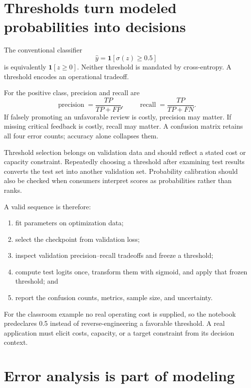 \section{Thresholds turn modeled probabilities into decisions}

The conventional classifier
\[
  \widehat y=\mathbf 1[\sigma(z)\geq0.5]
\]
is equivalently $\mathbf 1[z\geq0]$. Neither threshold is mandated by
cross-entropy. A threshold encodes an operational tradeoff.

For the positive class, precision and recall are
\[
  \operatorname{precision}=\frac{TP}{TP+FP},
  \qquad
  \operatorname{recall}=\frac{TP}{TP+FN}.
\]
If falsely promoting an unfavorable review is costly, precision may matter. If
missing critical feedback is costly, recall may matter. A confusion matrix
retains all four error counts; accuracy alone collapses them.

Threshold selection belongs on validation data and should reflect a stated
cost or capacity constraint. Repeatedly choosing a threshold after examining
test results converts the test set into another validation set. Probability
calibration should also be checked when consumers interpret scores as
probabilities rather than ranks.

A valid sequence is therefore:
\begin{enumerate}
  \item fit parameters on optimization data;
  \item select the checkpoint from validation loss;
  \item inspect validation precision--recall tradeoffs and freeze a threshold;
  \item compute test logits once, transform them with sigmoid, and apply that
  frozen threshold; and
  \item report the confusion counts, metrics, sample size, and uncertainty.
\end{enumerate}
For the classroom example no real operating cost is supplied, so the notebook
predeclares 0.5 instead of reverse-engineering a favorable threshold. A real
application must elicit costs, capacity, or a target constraint from its
decision context.


\section{Error analysis is part of modeling}

